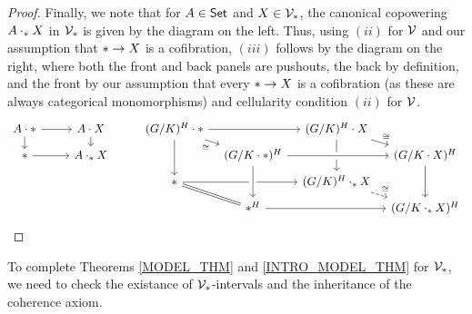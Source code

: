 \documentclass[a4paper,10pt
,draft
]{article}%
\renewcommand{\1}{\eta}%
\begin{document}
{\begin{proof}
        Finally, we note that for $A \in \mathsf{Set}$ and $X \in \V_{\**}$, the canonical copowering $A \cdot_{\**} X$ in $\V_{\**}$ is given by the diagram on the left.
        Thus, using $(ii)$ for $\mathcal V$ and our assumption that $\** \to X$ is a cofibration, $(iii)$ follows by the diagram on the right,
        where both the front and back panels are pushouts, the back by definition, and the front by our assumption that every $\** \to X$ is a cofibration (as these are always categorical monomorphisms) and cellularity condition $(ii)$ for $\mathcal V$.      
        \begin{equation}
              \begin{tikzcd}[row sep = tiny]
                    A \cdot \** \arrow[d] \arrow[r]
                    &
                    A \cdot X \arrow[d]
                    & %
                    (G/K)^H \cdot \** \arrow[dd] \arrow[rr] \arrow[dr, "\cong"']
                    &[-15pt]&[-15pt]
                    (G/K)^H \cdot X \arrow[dd] \arrow[dr, "\cong"]
                    \\
                    \** \arrow[r]
                    &
                    A \cdot_{\**} X
                    & %
                    &
                    (G/K \cdot \**)^H \arrow[rr, crossing over]
                    &&[-15pt]
                    (G/K \cdot X)^H \arrow[dd]
                    \\
                    && %
                    \** \arrow[rr] \arrow[dr, equal]
                    &&
                    (G/K)^H \cdot_{\**} X \arrow[dr, dashed, "\cong"]
                    \\
                    && %
                    & \**^H \arrow[rr] \arrow[uu, leftarrow, crossing over]
                    &&
                    (G/K \cdot_{\**} X)^H
              \end{tikzcd}
        \end{equation}
  \end{proof}
} %

To complete Theorems \ref{MODEL_THM} and \ref{INTRO_MODEL_THM} for $\V_{\**}$, we need to check the existance of $\V_{\**}$-intervals and the inheritance of the coherence axiom.
\end{document}
